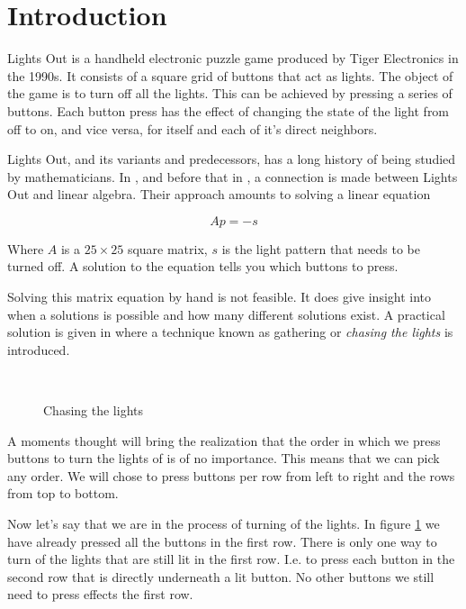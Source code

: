\section{Introduction}
Lights Out is a handheld electronic puzzle game produced by Tiger Electronics in
the 1990s. It consists of a square grid of buttons that act as lights. The
object of the game is to turn off all the lights. This can be achieved by
pressing a series of buttons. Each button press has the effect of changing the
state of the light from off to on, and vice versa, for itself and each of it's
direct neighbors.

Lights Out, and its variants and predecessors, has a long history of
being studied by mathematicians. In \cite{anderson98}, and before that in
\cite{pelletier87}, a connection is made between Lights Out and linear algebra.
Their approach amounts to solving a linear equation

\[
Ap=-s
\]

Where $A$ is a $25\times 25$ square matrix, $s$ is the light pattern that needs
to be turned off. A solution to the equation tells you which buttons to press.

Solving this matrix equation by hand is not feasible. It does give insight into
when a solutions is possible and how many different solutions exist. A practical
solution is given in \cite{martin01} where a technique known as gathering or
\emph{chasing the lights} is introduced.

\begin{figure}
  \mbox{
  }
  \caption{Chasing the lights}
  \label{chasing}
\end{figure}

A moments thought will bring the realization that the order in which we press
buttons to turn the lights of is of no importance. This means that we can pick
any order. We will chose to press buttons per row from left to right and the rows
from top to bottom.

Now let's say that we are in the process of turning of the lights. In figure
\ref{chasing} we have already pressed all the buttons in the first row. There is
only one way to turn of the lights that are still lit in the first row. I.e. to
press each button in the second row that is directly underneath a lit button. No
other buttons we still need to press effects the first row.

